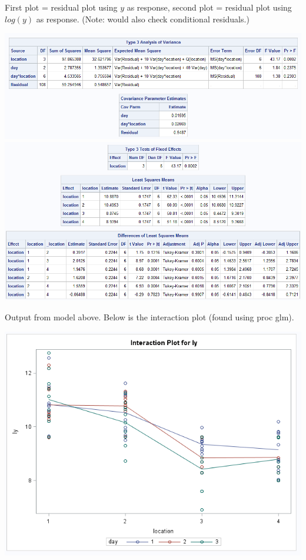 First plot = residual plot using $y$ as response, second plot = residual plot using $log(y)$ as response.  (Note: would also check conditional residuals.)

\begin{center}
\includegraphics[scale=0.7]{Campy3}\\
\includegraphics[scale=0.7]{Campy5}\\
\end{center}

Output from model above.  Below is the interaction plot (found using proc glm).

\begin{center}
\includegraphics[scale=0.7]{Campy4}
\end{center}

